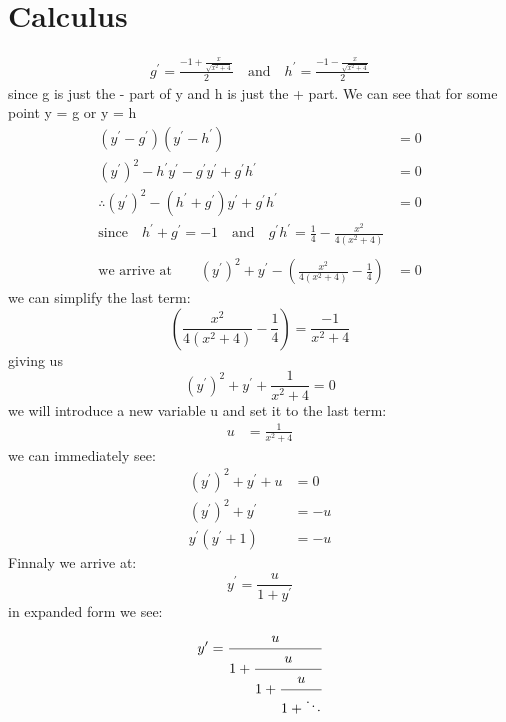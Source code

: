 \documentclass[a4paper]{article}
\begin{document}
\section*{Calculus}
\begin{align*}
    g^\prime = \frac{-1 + \frac{x}{\sqrt{x^2+4}}}{2} \quad\text{and}\quad h^\prime = \frac{-1 - \frac{x}{\sqrt{x^2+4}}}{2}
\end{align*}
since g is just the - part of y and h is just the + part. We can see that for some point y = g or y = h
\begin{align}
    (y^\prime-g^\prime)(y^\prime-h^\prime) &= 0\\
    (y^\prime)^2 - h^\prime y^\prime - g^\prime y^\prime + g^\prime h^\prime &= 0\\
    \therefore (y^\prime)^2 - (h^\prime + g^\prime)y^\prime + g^\prime h^\prime &= 0\\
    \text{since}\quad h^\prime + g^\prime = -1 \quad\text{and}\quad g^\prime h^\prime = \frac{1}{4}-\frac{x^2}{4(x^2+4)}\\\\
    \text{we arrive at}\qquad (y^\prime)^2+y^\prime-\left(\frac{x^2}{4(x^2+4)}-\frac{1}{4}\right) &= 0
\end{align}
we can simplify the last term:
\begin{equation}
    \left(\frac{x^2}{4(x^2+4)}-\frac{1}{4}\right) = \frac{-1}{x^2+4}
\end{equation}
giving us
\begin{equation}
    (y^\prime)^2+y^\prime+\frac{1}{x^2+4} = 0
\end{equation}
we will introduce a new variable u and set it to the last term:
\begin{align}
    u &= \frac{1}{x^2+4}
\end{align}
we can immediately see:
\begin{align}
    (y^\prime)^2+y^\prime+u&=0\\
    (y^\prime)^2+y^\prime&=-u\\
    y^\prime(y^\prime+1)&=-u
\end{align}
Finnaly we arrive at:
\begin{equation}
    y^\prime = \frac{u}{1+y^\prime}
\end{equation}
in expanded form we see:
\begin{equation}
    y^\prime=\cfrac{u}{1+\cfrac{u}{1+\cfrac{u}{1+\ddots}}}
\end{equation}
\end{document}
